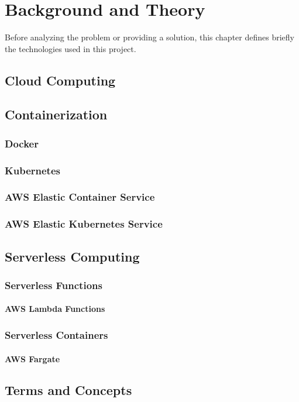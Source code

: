 \part{Background and Theory}

Before analyzing the problem or providing a solution,
this chapter defines briefly the technologies used in this project.

\chapter{Cloud Computing}

\chapter{Containerization}
\section{Docker}
\section{Kubernetes}
\section{AWS Elastic Container Service}
\section{AWS Elastic Kubernetes Service}

\chapter{Serverless Computing}
\section{Serverless Functions}
\subsection{AWS Lambda Functions}
\section{Serverless Containers}
\subsection{AWS Fargate}

\chapter{Terms and Concepts}


